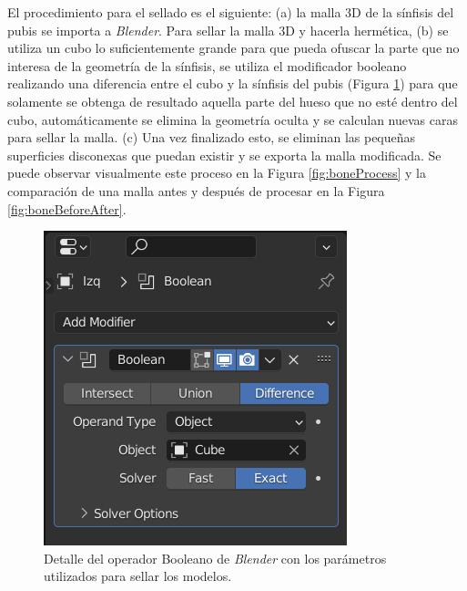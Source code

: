 El procedimiento para el sellado es el siguiente: (a) la malla 3D de la sínfisis del pubis se importa a \textit{Blender}. Para sellar la malla 3D y hacerla hermética, (b) se utiliza un cubo lo suficientemente grande para que pueda ofuscar la parte que no interesa de la geometría de la sínfisis, se utiliza el modificador booleano realizando una diferencia entre el cubo y la sínfisis del pubis (Figura \ref{fig:detailBoolean}) para que solamente se obtenga de resultado aquella parte del hueso que no esté dentro del cubo, automáticamente se elimina la geometría oculta y se calculan nuevas caras para sellar la malla. (c) Una vez finalizado esto, se eliminan las pequeñas superficies disconexas que puedan existir y se exporta la malla modificada. Se puede observar visualmente este proceso en la Figura \ref{fig:boneProcess} y la comparación de una malla antes y después de procesar en la Figura \ref{fig:boneBeforeAfter}.

\begin{figure}[h]
    \centering
    \includegraphics[width=0.6\linewidth]{imagenes/planningAndImplementation/3.png}
    \caption[Detalle del operador Booleano de Blender]{Detalle del operador Booleano de \textit{Blender} con los parámetros utilizados para sellar los modelos.}
    \label{fig:detailBoolean}
\end{figure}


